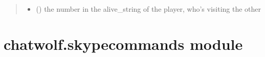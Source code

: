 \documentclass[letterpaper,10pt,english]{sphinxmanual}
\begin{document}
\begin{fulllineitems}
\begin{fulllineitems}
\begin{quote}
\begin{description}
\begin{itemize}
\item {} 
 () \textendash{} the number in the alive\_string of the player, who’s visiting the other

\end{itemize}

\end{description}\end{quote}

\end{fulllineitems}


\end{fulllineitems}



\section{chatwolf.skypecommands module}
\label{\detokenize{chatwolf:module-chatwolf.skypecommands}}\label{\detokenize{chatwolf:chatwolf-skypecommands-module}}
\end{document}
